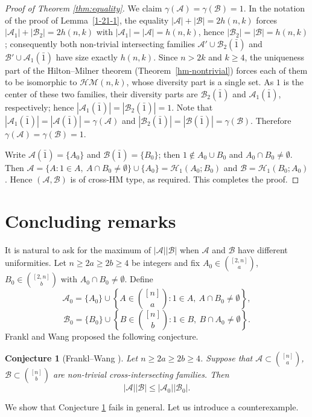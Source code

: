 \documentclass[a4paper,11pt]{article}
\newtheorem{conjecture}[theorem]{Conjecture}
\newcommand{\m}{\mathcal}
\begin{document}
\begin{proof}[Proof of Theorem \ref{thm:equality}]
We claim $\gamma(\m A)=\gamma(\m B)=1$.
In the notation of the proof of Lemma~\ref{1-21-1}, the
equality $|\m A|+|\m B|=2h(n,k)$ forces
$|\m A_1|+|\m B_2|=2h(n,k)$ with $|\m A_1|=|\m A|=h(n,k)$,
hence $|\m B_2|=|\m B|=h(n,k)$; consequently both
non-trivial intersecting families $\m A'\cup\m B_2(\bar1)$
and $\m B'\cup\m A_1(\bar1)$ have size exactly $h(n,k)$.
Since $n>2k$ and $k\ge4$, the uniqueness part of the
Hilton--Milner theorem (Theorem~\ref{hm-nontrivial}) forces
each of them to be isomorphic to $\m{HM}(n,k)$, whose
diversity part is a single set. As $1$ is the center of
these two families, their diversity parts are
$\m B_2(\bar1)$ and $\m A_1(\bar1)$, respectively; hence
$|\m A_1(\bar1)|=|\m B_2(\bar1)|=1$. Note that
$|\m A_1(\bar1)|=|\m A(\bar1)|=\gamma(\m A)$ and
$|\m B_2(\bar1)|=|\m B(\bar1)|=\gamma(\m B)$. Therefore
$\gamma(\m A)=\gamma(\m B)=1$. 

Write $\m A(\bar1)=\{A_0\}$ and $\m B(\bar1)=\{B_0\}$; then
$1\notin A_0\cup B_0$ and $A_0\cap B_0\ne\emptyset$. Then
$\m A=\{A:1\in A,\ A\cap B_0\ne\emptyset\}\cup\{A_0\}
=\m H_1(A_0;B_0)$ and $\m B=\m H_1(B_0;A_0)$. Hence $(\m A,\m B)$ is
of cross-HM type, as required.
This completes the proof.
\end{proof}

\section{Concluding remarks}\label{sec:concluding}
It is natural to ask for the maximum of
$|\m A||\m B|$ when $\m A$ and $\m B$ have different
uniformities.
Let $n \ge 2a \ge 2b \ge 4$ be integers and fix
$A_0 \in \binom{[2,n]}{a}$, $B_0 \in \binom{[2,n]}{b}$ with
$A_0 \cap B_0 \ne \emptyset$. Define
\[
\mathcal{A}_0 = \{A_0\} \cup \left\{ A \in \binom{[n]}{a} :
1 \in A,\ A \cap B_0 \ne \emptyset \right\},
\]
\[
\mathcal{B}_0 = \{B_0\} \cup \left\{ B \in \binom{[n]}{b} :
1 \in B,\ B \cap A_0 \ne \emptyset \right\}.
\]
Frankl and Wang \cite{FW2026} proposed the following conjecture.

\begin{conjecture}[Frankl--Wang \cite{FW2026}]\label{FW-conj}
Let $n \ge 2a \ge 2b \ge 4$. Suppose that
$\mathcal{A} \subset \binom{[n]}{a}$,
$\mathcal{B} \subset \binom{[n]}{b}$ are non-trivial cross-intersecting families. Then
\[
|\mathcal{A}||\mathcal{B}| \le |\mathcal{A}_0||\mathcal{B}_0|.
\]
\end{conjecture}
We show that Conjecture \ref{FW-conj} fails in general.
Let us introduce a counterexample.
\end{document}

